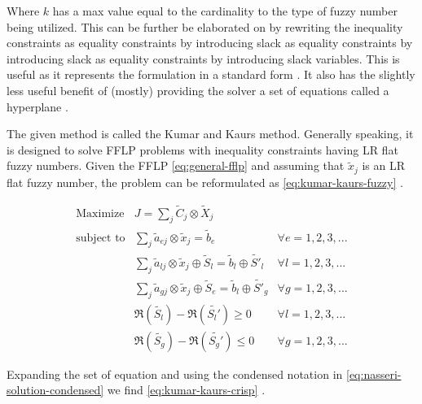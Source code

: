 \documentclass[11pt,a4paper,final]{article}
\begin{document}
Where \(k\) has a max value equal to the cardinality to the type of fuzzy number being utilized. This can be further be
elaborated on by rewriting the inequality constraints as equality constraints by introducing slack as equality
constraints by introducing slack as equality constraints by introducing slack variables. This is useful as it
represents the formulation in a standard form \cite{chen-2010-applied,vanderbei-2020-linear-progr}. It also has the
slightly less useful benefit of (mostly) providing the solver a set of equations called a hyperplane \cite{chen-2010-applied}.

The given method is called the Kumar and Kaurs method. Generally speaking, it is designed to solve FFLP problems with
inequality constraints having LR flat fuzzy numbers. Given the FFLP \autoref{eq:general-fflp} and assuming that
\(\tilde{x}_j\) is an LR flat fuzzy number, the problem can be reformulated as \autoref{eq:kumar-kaurs-fuzzy}
\cite{kaur-2016-introd-fuzzy}.

\begin{equation}
\label{eq:kumar-kaurs-fuzzy}
\begin{array}{lll}
\text{Maximize}   & J = \sum_j \tilde{C}_j \otimes \tilde{X}_j              &                                              \\
\text{subject to} & \sum_j \tilde{a}_{ej} \otimes \tilde{x}_j               = \tilde{b}_e & \forall e = 1,2,3,...                \\
                  & \sum_j \tilde{a}_{lj} \otimes \tilde{x}_j \oplus \tilde{S}_l = \tilde{b}_l \oplus \tilde{S'}_l & \forall l = 1,2,3,... \\
                  & \sum_j \tilde{a}_{gj} \otimes \tilde{x}_j \oplus \tilde{S}_e = \tilde{b}_l \oplus \tilde{S'}_g & \forall g = 1,2,3,... \\
                  & \mathfrak{R}(\tilde{S_l}) - \mathfrak{R}(\tilde{S_l'}) \ge 0                                     & \forall l = 1,2,3,...      \\
                  & \mathfrak{R}(\tilde{S_g}) - \mathfrak{R}(\tilde{S_g'}) \le 0                                     & \forall g = 1,2,3,...
\end{array}
\end{equation}

Expanding the set of equation and using the condensed notation in \autoref{eq:nasseri-solution-condensed} we find
\autoref{eq:kumar-kaurs-crisp} \cite{kaur-2016-introd-fuzzy}.
\end{document}
